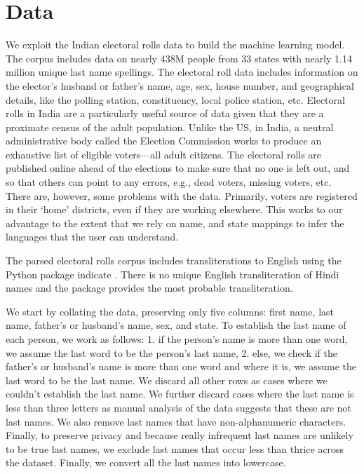 \documentclass[11pt,  letterpaper]{article}
\begin{document}
  







\section{Data}

We exploit the Indian electoral rolls data \citep{DVN/OG47IV_2023, DVN/MUEGDT_2018} to build the machine learning model. The corpus includes data on nearly 438M people from 33 states with nearly 1.14 million unique last name spellings. The electoral roll data includes information on the elector's husband or father’s name, age, sex, house number, and geographical details, like the polling station, constituency, local police station, etc. Electoral rolls in India are a particularly useful source of data given that they are a proximate census of the adult population. Unlike the US, in India, a neutral administrative body called the Election Commission works to produce an exhaustive list of eligible voters—all adult citizens. The electoral rolls are published online ahead of the elections to make sure that no one is left out, and so that others can point to any errors, e.g., dead voters, missing voters, etc. There are, however, some problems with the data. Primarily, voters are registered in their `home' districts, even if they are working elsewhere. This works to our advantage to the extent that we rely on name, and state mappings to infer the languages that the user can understand.

The parsed electoral rolls corpus \citep{DVN/MUEGDT_2018} includes transliterations to English using the Python package indicate \citep{Chintalapati_Indicate_Transliterate_Indic_2022}. There is no unique English transliteration of Hindi names and the package provides the most probable transliteration. 

We start by collating the data, preserving only five columns: first name, last name, father's or husband's name, sex, and state. To establish the last name of each person, we work as follows: 1. if the person's name is more than one word, we assume the last word to be the person's last name, 2. else, we check if the father's or husband's name is more than one word and where it is, we assume the last word to be the last name. We discard all other rows as cases where we couldn't establish the last name. We further discard cases where the last name is less than three letters as manual analysis of the data suggests that these are not last names. We also remove last names that have non-alphanumeric characters. Finally, to preserve privacy and because really infrequent last names are unlikely to be true last names, we exclude last names that occur less than thrice across the dataset. Finally, we convert all the last names into lowercase. 
\end{document}
